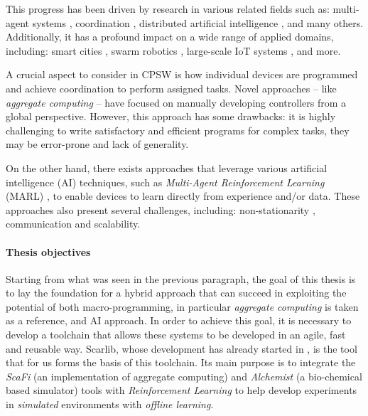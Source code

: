 \documentclass[12pt,a4paper,openright,twoside]{book}
\begin{document}
This progress has been driven by research in various related fields such as: multi-agent systems \cite{dorri2018multi},
     coordination \cite{yang2022overview}, distributed artificial intelligence \cite{bond2014readings}, and many others. 
     Additionally, it has a profound impact on a wide range of applied domains, including: smart cities \cite{zedadra2019swarm}, 
     swarm robotics \cite{brambilla2013swarm}, large-scale IoT systems \cite{uslu2023role}, and more.

A crucial aspect to consider in CPSW is how individual devices are programmed and achieve coordination to perform assigned tasks. 
Novel approaches -- like \emph{aggregate computing} \cite{viroli2018field} -- have focused on manually developing
controllers from a global perspective. However, this approach has some drawbacks: it is highly challenging to write satisfactory 
and efficient programs for complex tasks, they may be error-prone and lack of generality.

On the other hand, there exists approaches that leverage various artificial intelligence (AI) techniques, 
such as \emph{Multi-Agent Reinforcement Learning} (MARL) \cite{busoniu2008comprehensive},
to enable devices to learn directly from experience and/or data. These approaches also present several challenges, including: non-stationarity 
\cite{hernandez2017survey}, communication and scalability.

%
\paragraph{Thesis objectives}

Starting from what was seen in the previous paragraph, the goal of this thesis is to lay the foundation for a hybrid approach 
    that can succeed in exploiting the potential of both macro-programming, in particular \emph{aggregate computing} is taken as a 
    reference, and AI approach.
    In order to achieve this goal, it is necessary to develop a toolchain that allows these systems to be developed in an agile,
    fast and reusable way. 
    Scarlib, whose development has already started in \cite{scarlib}, is the tool that for us forms the basis of this toolchain.
    Its main purpose is to integrate the \emph{ScaFi} \cite{casadei2022scafi} (an implementation of aggregate computing) 
    and \emph{Alchemist} \cite{pianini2013chemical} (a bio-chemical based simulator) tools with \emph{Reinforcement Learning} 
    to help develop experiments in \emph{simulated} environments with \emph{offline learning}.
\end{document}
